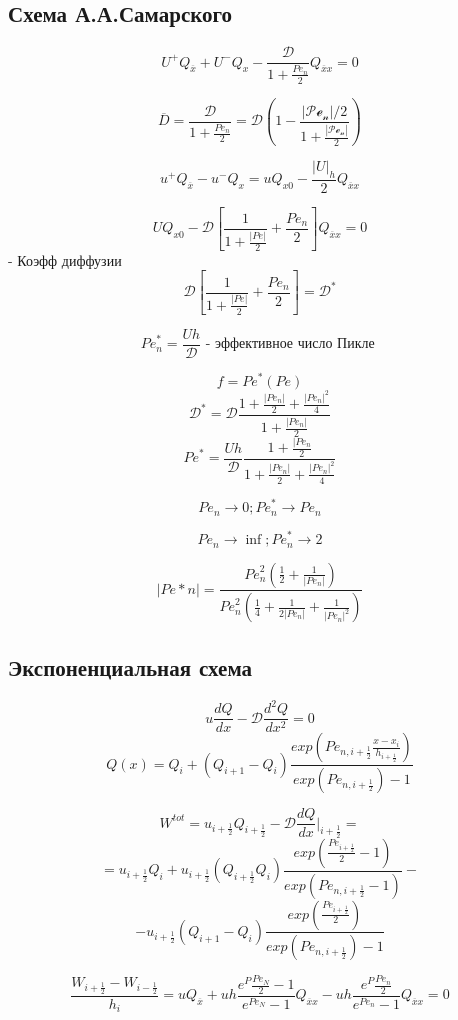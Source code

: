 \documentclass[12pt, a4paper]{article}
\begin{document}
\subsection{Схема А.А.Самарского}

\[ U^+Q_{\overline{x}} + U^- Q_x - \frac{\mathcal{D }}{1 + \frac{{Pe}_n }{2}} Q_{\overline{x}x} = 0 \]

\[ \overline{D} = \frac{\mathcal{D }}{1 + \frac{{Pe}_n}{2}} = \mathcal{D(1- \frac{|{Pe}_n| /2}{1+\frac{|{Pe}_n| }{2}})} \]

\[ u^+ Q_{\overline{x}} - u^-Q_x = u Q_{x0} - \frac{|U|_h}{2}Q_{\overline{x} x}\]

\[ U Q_{x0} - \mathcal{D} [\frac{1}{1+\frac{|Pe|}{2}}+\frac{{Pe}_n }{2}]Q_{\overline{x}x} = 0 \]
- Коэфф диффузии
\[ \mathcal{D} [\frac{1}{1+\frac{|Pe|}{2}}+\frac{{Pe}_n }{2}] = \mathcal{D}^* \]

\[ {Pe}^*_n = \frac{Uh }{\mathcal{D }} \textrm{ - эффективное число Пикле } \]

\[ f = {Pe}^*({Pe}) \]
\[ \mathcal{D}^* = \mathcal{D} \frac{1+\frac{|{Pe}_n|}{2}+\frac{|{Pe}_n|^2}{4}}{1+\frac{|{Pe}_n|}{2}} \]
\[ {Pe}^* = \frac{Uh }{\mathcal{D}} \frac{1+\frac{|{Pe}_n }{2}}{1+\frac{|{Pe}_n|}{2}+\frac{|{Pe}_n|^2}{4}} \]

\[ {Pe}_n \rightarrow 0; {Pe}^*_n \rightarrow {Pe}_n  \]

\[ {Pe}_n \rightarrow \inf; {Pe}^*_n \rightarrow 2 \]

\[ |{Pe}*n| = \frac{{Pe}^2_n (\frac{1}{2} + \frac{1}{|{Pe}_n|})}{{Pe}^2_n (\frac{1}{4}+\frac{1}{2|{Pe}_n|}+\frac{1}{|{Pe}_n|^2})} \]

\subsection{Экспоненциальная схема}

\[ u \frac{dQ }{dx} - \mathcal{D} \frac{d^2Q }{dx^2} = 0 \]
\[ Q(x) = Q_i + {(Q_{i+1} - Q_i)}\frac{{exp({Pe}_{n, i+ \frac{1}{2}}\frac{x-x_i }{h_{i+\frac{1}{2}}})}}{exp({Pe}_{n, i+\frac{1}{2}})-1} \]

\[ W^{tot} = u_{i+\frac{1}{2}} Q_{i+\frac{1}{2}} - \mathcal{D} \frac{dQ}{dx}|_{i+\frac{1}{2}} = \]
\[ = u_{i+\frac{1}{2}} Q_i + u_{i+\frac{1}{2}}(Q_{i+\frac{1}{2}} Q_i) \frac{exp(\frac{{Pe}_{i+\frac{1}{2}}}{2}-1)}{exp({Pe_{n, i+\frac{1}{2}}}-1)} - \]
\[ - u_{i+\frac{1}{2}}(Q_{i+1}-Q_i) \frac{exp(\frac{{Pe}_{i+\frac{1}{2}}}{2})}{exp({Pe_{n, i+\frac{1}{2}}})-1} \]

\[ \frac{W_{i+\frac{1}{2}} - W_{i-\frac{1}{2}}}{h_i} = u Q_{\overline{x}} + u h \frac{e^P \frac{{Pe}_N}{2}-1}{e^{{Pe}_N}-1} Q_{\overline{x}x} - u h \frac{e^P \frac{{Pe}_n}{2}}{e^{{Pe}_n}-1} Q_{\overline{x}x} = 0 \]
\end{document}
